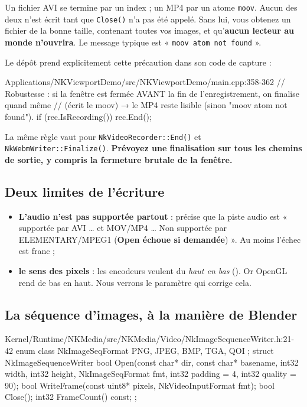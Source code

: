 \begin{nkpiege}
Un fichier AVI se termine par un index ; un MP4 par un atome \texttt{moov}.
Aucun des deux n'est écrit tant que \texttt{Close()} n'a pas été appelé. Sans
lui, vous obtenez un fichier de la bonne taille, contenant toutes vos images, et
qu'\textbf{aucun lecteur au monde n'ouvrira}. Le message typique est
« \texttt{moov atom not found} ».

Le dépôt prend explicitement cette précaution dans son code de capture :

\begin{nkcode}{Applications/NKViewportDemo/src/NKViewportDemo/main.cpp:358-362}
    // Robustesse : si la fenêtre est fermée AVANT la fin de l'enregistrement, on finalise quand même
    // (écrit le moov) → le MP4 reste lisible (sinon "moov atom not found").
    if (rec.IsRecording()) {
        rec.End();
    }
\end{nkcode}

La même règle vaut pour \texttt{NkVideoRecorder::End()} et
\texttt{NkWebmWriter::Finalize()}. \textbf{Prévoyez une finalisation sur tous les
chemins de sortie, y compris la fermeture brutale de la fenêtre.}
\end{nkpiege}

\subsection{Deux limites de l'écriture}

\begin{itemize}
  \item \textbf{L'audio n'est pas supportée partout} :
         précise que la piste audio est
        « supportée par AVI \dots{} et MOV/MP4 \dots{} Non supportée par
        ELEMENTARY/MPEG1 (\textbf{Open échoue si demandée}) ». Au moins l'échec
        est franc ;
  \item \textbf{le sens des pixels} : les encodeurs veulent du \emph{haut en
        bas} (). Or OpenGL rend de bas en
        haut. Nous verrons le paramètre qui corrige cela.
\end{itemize}

\subsection{La séquence d'images, à la manière de Blender}

\begin{nkcode}{Kernel/Runtime/NKMedia/src/NKMedia/Video/NkImageSequenceWriter.h:21-42}
enum class NkImageSeqFormat { PNG, JPEG, BMP, TGA, QOI };
struct NkImageSequenceWriter {
        bool Open(const char* dir, const char* basename, int32 width, int32 height,
                  NkImageSeqFormat fmt, int32 padding = 4, int32 quality = 90);
        bool WriteFrame(const uint8* pixels, NkVideoInputFormat fmt);
        bool Close();  int32 FrameCount() const;
};
\end{nkcode}

